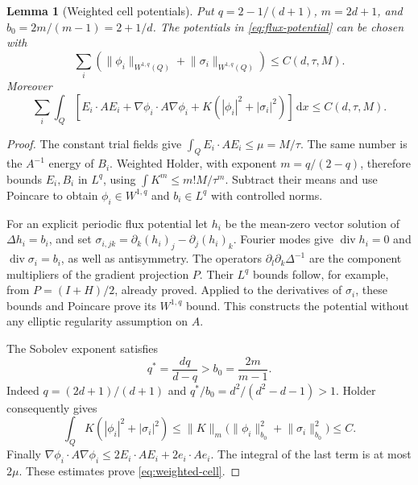 \documentclass[11pt,a4paper]{article}
\numberwithin{equation}{section}
\newtheorem{lemma}[theorem]{Lemma}
\theoremstyle{definition}
\theoremstyle{remark}\newtheorem{remark}[theorem]{Remark}
\DeclareMathOperator{\diver}{div}
\newcommand{\Id}{I}
\newcommand{\dd}{\,\mathrm dx}
\newcommand{\norm}[1]{\lVert #1\rVert}
\begin{document}
\begin{lemma}[Weighted cell potentials]\label{lem:weighted-potentials}
Put \(q=2-1/(d+1)\), \(m=2d+1\), and \(b_0=2m/(m-1)=2+1/d\).
The potentials in \eqref{eq:flux-potential} can be chosen with
\[
 \sum_i\left(\norm{\phi_i}_{W^{1,q}(Q)}
                    +\norm{\sigma_i}_{W^{1,q}(Q)}\right)
 \leq C(d,\tau,M).
\]
Moreover
\begin{equation}\label{eq:weighted-cell}
 \sum_i\int_Q
 \left[E_i\cdot AE_i+\nabla\phi_i\cdot A\nabla\phi_i
                  +K(|\phi_i|^2+|\sigma_i|^2)\right]\dd
 \leq C(d,\tau,M).
\end{equation}
\end{lemma}
\begin{proof}
The constant trial fields give
\(\int_QE_i\cdot AE_i\leq\mu=M/\tau\).
The same number is the \(A^{-1}\) energy of \(B_i\).
Weighted Holder, with exponent \(m=q/(2-q)\), therefore bounds
\(E_i,B_i\) in \(L^q\), using
\(\int K^m\leq m!M/\tau^m\).
Subtract their means and use Poincare to obtain
\(\phi_i\in W^{1,q}\) and \(b_i\in L^q\) with controlled norms.

For an explicit periodic flux potential let \(h_i\) be the mean-zero
vector solution of \(\Delta h_i=b_i\), and set
\(\sigma_{i,jk}=\partial_k(h_i)_j-\partial_j(h_i)_k\).
Fourier modes give \(\diver h_i=0\) and
\(\diver\sigma_i=b_i\), as well as antisymmetry.
The operators \(\partial_l\partial_k\Delta^{-1}\) are the
component multipliers of the gradient projection \(P\).
Their \(L^q\) bounds follow, for example, from
\(P=(\Id+H)/2\), already proved. Applied to the derivatives
of \(\sigma_i\), these bounds and Poincare prove its \(W^{1,q}\)
bound. This constructs the potential without any elliptic
regularity assumption on \(A\).

The Sobolev exponent satisfies
\[
 q^*=\frac{dq}{d-q}>b_0=\frac{2m}{m-1}.
\]
Indeed \(q=(2d+1)/(d+1)\) and
\(q^*/b_0=d^2/(d^2-d-1)>1\).
Holder consequently gives
\[
 \int_QK(|\phi_i|^2+|\sigma_i|^2)
 \leq\norm K_m\bigl(\norm{\phi_i}_{b_0}^2
                              +\norm{\sigma_i}_{b_0}^2\bigr)\leq C .
\]
Finally
\(\nabla\phi_i\cdot A\nabla\phi_i
\leq2E_i\cdot AE_i+2e_i\cdot Ae_i\).
The integral of the last term is at most \(2\mu\).
These estimates prove \eqref{eq:weighted-cell}.
\end{proof}
\end{document}

